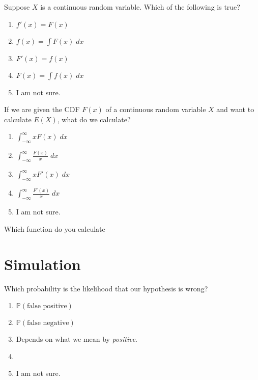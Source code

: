 \documentclass[t, 14pt]{beamer}
\begin{document}
\begin{frame}
  Suppose \(X\) is a continuous random variable. Which of the following is true?

  \begin{enumerate}
    \item \(f'(x) = F(x)\)
    \item \(f(x) = \int F(x) \;dx\)
    \item \(F'(x) = f(x)\)
    \item \(F(x) = \int f(x) \;dx\)
    \item I am not sure.
  \end{enumerate}
\end{frame}


\begin{frame}
  If we are given the CDF \(F(x)\) of a continuous random variable \(X\) and want to calculate \(E(X)\), what do we calculate?

  \begin{multicols}{2}
    \begin{enumerate}
      \item \(\int_{-\infty}^{\infty} x F(x) \;dx\)
      \item \(\int_{-\infty}^{\infty} \frac{F(x)}{x} \;dx\)
      \item \(\int_{-\infty}^{\infty} x F'(x) \;dx\)
      \item \(\int_{-\infty}^{\infty} \frac{F'(x)}{x} \;dx\)
        \columnbreak
      \item I am not sure.
    \end{enumerate}
  \end{multicols}
\end{frame}

\begin{frame}
  Which function do you calculate 
\end{frame}

\section{Simulation}

\begin{frame}
  Which probability is the likelihood that our hypothesis  is wrong?

  \begin{enumerate}
    \item \(\mathbb{P}(\text{false positive})\)
    \item \(\mathbb{P}(\text{false negative})\)
    \item Depends on what we mean by \emph{positive}.
    \item 
    \item I am not sure.
  \end{enumerate}
\end{frame}
\end{document}

